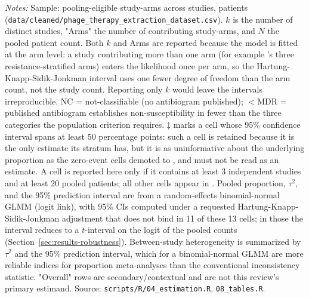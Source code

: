 \begin{table}[htbp]
\begin{threeparttable}
\begin{tablenotes}
\item \textit{Notes:} Sample: \PrismaPooledArms pooling-eligible study-arms across \PrismaPooledStudies studies, \PatientsAnalysed patients (\texttt{data/cleaned/phage\_therapy\_extraction\_dataset.csv}). $k$ is the number of distinct studies, "Arms" the number of contributing study-arms, and $N$ the pooled patient count. Both $k$ and Arms are reported because the model is fitted at the arm level: a study contributing more than one arm (for example \citeauthor{Pirnay2024_natmicrobiol}'s three resistance-stratified arms) enters the likelihood once per arm, so the Hartung-Knapp-Sidik-Jonkman interval uses one fewer degree of freedom than the arm count, not the study count. Reporting only $k$ would leave the intervals irreproducible. NC = not-classifiable (no antibiogram published); $<$MDR = published antibiogram establishes non-susceptibility in fewer than the three categories the population criterion requires. $\ddagger$ marks a cell whose 95\% confidence interval spans at least 50 percentage points: such a cell is retained because it is the only estimate its stratum has, but it is as uninformative about the underlying proportion as the zero-event cells demoted to , and must not be read as an estimate. A cell is reported here only if it contains at least 3 independent studies and at least 20 pooled patients; all other cells appear in . Pooled proportion, $\tau^2$, and the 95\% prediction interval are from a random-effects binomial-normal GLMM (logit link), with 95\% CIs computed under a requested Hartung-Knapp-Sidik-Jonkman adjustment that does not bind in 11 of these 13 cells; in those the interval reduces to a $t$-interval on the logit of the pooled counts (Section~\ref{sec:results-robustness}). Between-study heterogeneity is summarized by $\tau^2$ and the 95\% prediction interval, which for a binomial-normal GLMM are more reliable indices for proportion meta-analyses than the conventional inconsistency statistic. "Overall" rows are secondary/contextual and are not this review's primary estimand. Source: \texttt{scripts/R/04\_estimation.R}, \texttt{08\_tables.R}.
\end{tablenotes}
\end{threeparttable}
\end{table}

